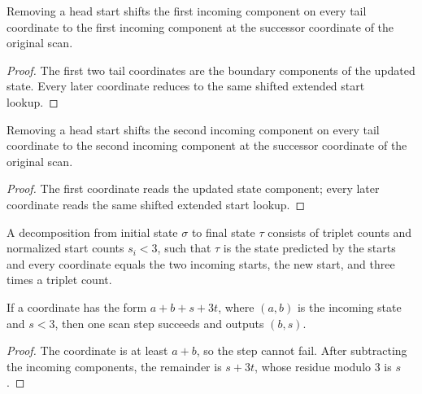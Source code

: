 \begin{lemma}

  \label{lem:scan_prev2_tail}
  Removing a head start shifts the first incoming component on every tail
  coordinate to the first incoming component at the successor coordinate
  of the original scan.
\end{lemma}
\begin{proof}

\leanok
  The first two tail coordinates are the boundary components of the
  updated state.  Every later coordinate reduces to the same shifted
  extended start lookup.
\end{proof}

\begin{lemma}

  \label{lem:scan_prev1_tail}
  Removing a head start shifts the second incoming component on every tail
  coordinate to the second incoming component at the successor coordinate
  of the original scan.
\end{lemma}
\begin{proof}

\leanok
  The first coordinate reads the updated state component; every later
  coordinate reads the same shifted extended start lookup.
\end{proof}

\begin{definition}

  \label{def:scan_decomp}
  A decomposition from initial state \(\sigma\) to final state \(\tau\)
  consists of triplet counts and normalized start counts \(s_i<3\), such
  that \(\tau\) is the state predicted by the starts and every coordinate
  equals the two incoming starts, the new start, and three times a triplet
  count.
\end{definition}

\begin{lemma}

  \label{lem:scan_step_of_coord}
  If a coordinate has the form \(a+b+s+3t\), where \((a,b)\) is the
  incoming state and \(s<3\), then one scan step succeeds and outputs
  \((b,s)\).
\end{lemma}
\begin{proof}

\leanok
  The coordinate is at least \(a+b\), so the step cannot fail.  After
  subtracting the incoming components, the remainder is \(s+3t\), whose
  residue modulo \(3\) is \(s\).
\end{proof}

